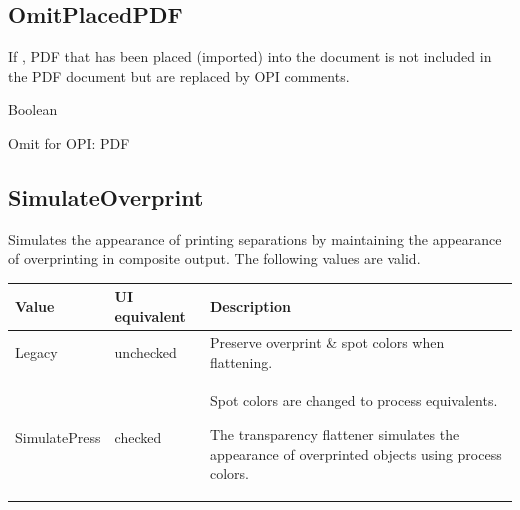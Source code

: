 \documentclass[letterpaper,12pt,english,openany,oneside]{sphinxmanual}
\begin{document}
\subsection{OmitPlacedPDF}
\label{\detokenize{PDF_Create_NewNamespaces:omitplacedpdf}}
If  , PDF that has been placed (imported) into the document is not included in the PDF document but are replaced by OPI comments.

\label{\detokenize{PDF_Create_NewNamespaces:type-36}}

Boolean

\label{\detokenize{PDF_Create_NewNamespaces:ui-name-36}}

Omit for OPI: PDF

\label{\detokenize{PDF_Create_NewNamespaces:default-value-35}}

\begin{sphinxVerbatim}[commandchars=\\\{\}]
\end{sphinxVerbatim}




\subsection{SimulateOverprint}
\label{\detokenize{PDF_Create_NewNamespaces:simulateoverprint}}
Simulates the appearance of printing separations by maintaining the appearance of overprinting in composite output. The following values are valid.


\begin{savenotes}\sphinxattablestart
\centering
{}\label{\detokenize{PDF_Create_NewNamespaces:section-5}}\nobreak
\begin{tabulary}{\linewidth}[t]{|T|T|T|}
\hline
\sphinxstyletheadfamily 
Value
&\sphinxstyletheadfamily 
UI equivalent
&\sphinxstyletheadfamily 
Description
\\
\hline
Legacy
&
unchecked
&
Preserve overprint \& spot colors when flattening.
\\
\hline
SimulatePress
&
checked
&
Spot colors are changed to process equivalents.

The transparency flattener simulates the appearance of overprinted objects using process colors.
\\
\hline
\end{tabulary}
\par
\sphinxattableend\end{savenotes}
\end{document}
